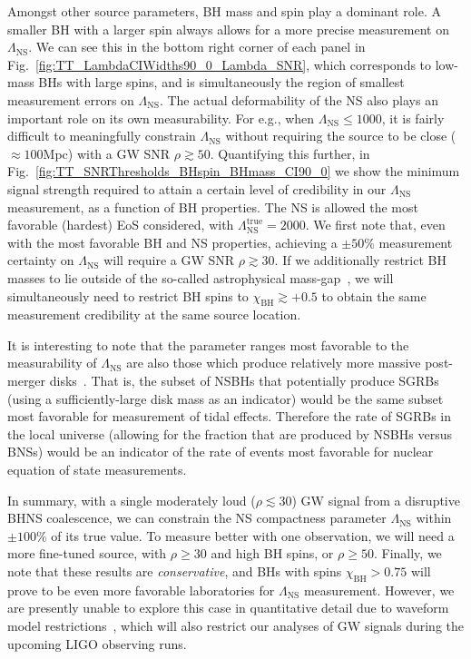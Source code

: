 \documentclass[aps,prd,amsmath,floats,floatfix, twocolumn,
superscriptaddress,nofootinbib,showpacs]{revtex4-1}
\newcommand{\lambdans}{\Lambda_\mathrm{NS}}
\newcommand{\chibh}{\chi_\mathrm{BH}}
\begin{document}
Amongst other source parameters, BH mass and spin play a dominant role. A smaller
BH with a larger spin always allows for a more precise measurement on $\lambdans$.
We can see this in the bottom right corner of each panel in
Fig.~\ref{fig:TT_LambdaCIWidths90_0_Lambda_SNR}, which corresponds to low-mass BHs
with large spins, and is simultaneously the region of smallest measurement errors on $\lambdans$.
The actual deformability of the NS also plays an important role on its own
measurability. For e.g., when $\lambdans\leq 1000$, it is fairly difficult
to meaningfully constrain $\lambdans$ without requiring the source to be
close ($\approx 100$Mpc) with a GW SNR $\rho\gtrsim 50$. Quantifying this further,
in Fig.~\ref{fig:TT_SNRThresholds_BHspin_BHmass_CI90_0} we show the minimum
signal strength required to attain a certain level of credibility in our
$\lambdans$ measurement, as a function of BH properties. The NS is allowed
the most favorable (hardest) EoS considered, with $\lambdans^\mathrm{true}=2000$.
% 
We first note that, even with the most favorable BH and NS properties, achieving
a $\pm 50\%$ measurement certainty on $\lambdans$ will require a GW SNR
$\rho\gtrsim 30$. If we additionally restrict BH masses to lie outside of the so-called
astrophysical mass-gap~\cite{Bailyn:1997xt,Kalogera:1996ci,Kreidberg:2012,
Littenberg:2015tpa}, we will simultaneously need to restrict BH spins
to $\chibh\gtrsim +0.5$ to obtain the same measurement credibility at the same
source location.


It is interesting to note that the parameter ranges most favorable to
the measurability of $\lambdans$ are also those which produce
relatively more massive post-merger disks~\cite{Foucart2012}. That is, 
the subset of NSBHs that potentially produce SGRBs (using a sufficiently-large
disk mass as an indicator) would be the same subset most favorable
for measurement of tidal effects. Therefore the rate of SGRBs in the 
local universe (allowing for the fraction that are produced by NSBHs versus
BNSs) would be an indicator of the rate of events most favorable for nuclear
equation of state measurements.


In summary, with a single moderately loud ($\rho\lesssim 30$) GW signal from
a disruptive BHNS coalescence, we can constrain
the NS compactness parameter $\lambdans$ within $\pm 100\%$ of its true value.
To measure better with one observation, we will need a more fine-tuned source, with
$\rho\geq 30$ and high BH spins, or $\rho\geq 50$.
% 
Finally, we note that these results are {\it conservative}, and 
BHs with spins $\chibh > 0.75$ will prove to be even more favorable laboratories
for $\lambdans$ measurement. However, we are presently unable to explore this case
in quantitative detail due to waveform model restrictions~\cite{Lackey:2013axa},
which will also restrict our analyses of GW signals during the upcoming LIGO
observing runs.
\end{document}
